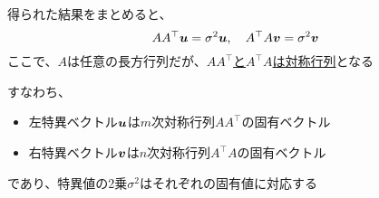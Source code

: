 \documentclass[../../../topic_linear-algebra]{subfiles}
\begin{document}
得られた結果をまとめると、
\begin{equation*}
  A A^\top \vb*{u} = \sigma^2 \vb*{u} , \quad A^\top A \vb*{v} = \sigma^2 \vb*{v}
\end{equation*}
ここで、$A$は任意の長方行列だが、\hyperref[thm:symmetric-products-of-any-matrix]{$A A^\top$と$A^\top A$は対称行列}となる

\br

すなわち、
\begin{itemize}
  \item 左特異ベクトル$\vb*{u}$は$m$次対称行列$A A^\top$の固有ベクトル
  \item 右特異ベクトル$\vb*{v}$は$n$次対称行列$A^\top A$の固有ベクトル
\end{itemize}
であり、特異値の2乗$\sigma^2$はそれぞれの固有値に対応する
\end{document}
